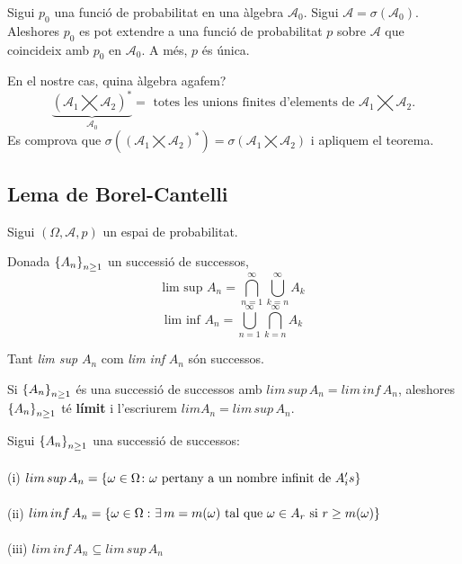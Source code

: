\begin{thm}
  Sigui $p_{0}$ una funció de probabilitat en una àlgebra $\mathcal{A}_{0}$. Sigui $\mathcal{A} = \sigma(\mathcal{A}_{0})$. \\
  Aleshores $p_{0}$ es pot extendre a una funció de probabilitat $p$ sobre $\mathcal{A}$ que coincideix amb $p_{0}$ en $\mathcal{A}_{0}$. A més, $p$ és única.
\end{thm}

En el nostre cas, quina àlgebra agafem? 
\[
    \underbrace{(\mathcal{A}_{1}\bigtimes\mathcal{A}_{2})^{*}}_{\mathcal{A}_{0}} = \text{ totes les unions finites d'elements de } \mathcal{A}_{1}\bigtimes\mathcal{A}_{2}.
\]
Es comprova que $\sigma((\mathcal{A}_{1}\bigtimes\mathcal{A}_{2})^{*}) = \sigma(\mathcal{A}_{1}\bigtimes\mathcal{A}_{2})$ i apliquem el teorema.

\subsection{Lema de Borel-Cantelli}

Sigui $(\Omega, \mathcal{A}, p)$ un espai de probabilitat.

\begin{defi}
  Donada $\left\{A_{n}\right\}_{n\geq 1}$ un successió de successos, 
  \[
    \text{lim sup } A_{n} = \bigcap\limits_{n=1}^{\infty}\bigcup\limits_{k=n}^{\infty}A_{k}
  \]
  \[
    \text{lim inf } A_{n} = \bigcup\limits_{n=1}^{\infty}\bigcap\limits_{k=n}^{\infty}A_{k}
  \]
\end{defi}

\begin{obs}
  Tant \textit{lim sup} $A_{n}$ com \textit{lim inf} $A_{n}$ són successos.
\end{obs}

\begin{defi}
  Si $\left\{A_{n}\right\}_{n\geq 1}$ és una successió de successos amb $lim \, sup\, A_{n} = lim\, inf\, A_{n}$, aleshores $\left\{A_{n}\right\}_{n\geq 1}$ té \textbf{límit} i l'escriurem $lim A_{n} = lim \, sup \, A_{n}$.
\end{defi}

\newpage

\begin{properties}
  Sigui $\left\{A_{n}\right\}_{n\geq 1}$ una successió de successos: \\\\
  (i) $lim \, sup \, A_{n} = \left\{\omega \in \Omega \colon \omega \text{ pertany a un nombre infinit de } A_{i}'s\right\}$ \\\\
  (ii) $lim \, inf \, A_{n} = \left\{\omega \in \Omega\, \colon \exists \, m = m(\omega) \text{ tal que } \omega\in A_{r} \text{ si } r \geq m(\omega)\right\}$ \\\\
  (iii) $lim \, inf\, A_{n} \subseteq lim\, sup \, A_{n}$ \\
\end{properties}

